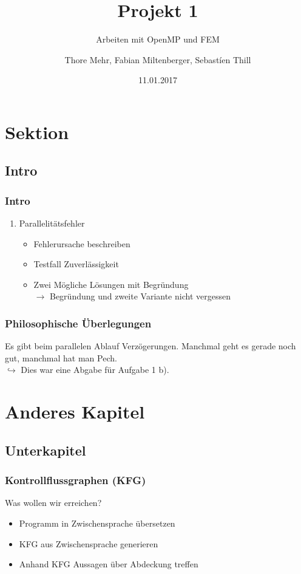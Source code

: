 \documentclass[german,notes,18pt]{beamer}
\title{Projekt 1}
\subtitle{Arbeiten mit OpenMP und FEM}
\author{Thore Mehr, Fabian Miltenberger, Sebastíen Thill}
\date{11.01.2017}
\institute{Lehrstuhl für Rechnerarchitektur und Parallelverarbeitung}
\begin{document}
	
	\frame{\titlepage}
	
	\section{Sektion}
	\subsection{Intro}
	\begin{frame}
		\frametitle{Intro}
		
		\begin{enumerate}
			\item Parallelitätsfehler
			\begin{itemize}
				\item Fehlerursache beschreiben
				\item Testfall Zuverlässigkeit
				\item Zwei Mögliche Lösungen mit Begründung \\
				$\rightarrow$ Begründung und zweite Variante nicht vergessen
			\end{itemize}
		\end{enumerate}
	\end{frame}
	
	\begin{frame}
		\frametitle{Philosophische Überlegungen}
		Es gibt beim parallelen Ablauf Verzögerungen. Manchmal geht es gerade noch gut, manchmal hat man Pech.
		\\
		\vspace{1cm}
		\onslide<2->
		$\hookrightarrow$ Dies war eine Abgabe für Aufgabe 1 b).
	\end{frame}
	
	
	
	\section{Anderes Kapitel}
	\subsection{Unterkapitel}
	\begin{frame}
		\frametitle{Kontrollflussgraphen (KFG)}
		
		Was wollen wir erreichen?
		\begin{itemize}
			\item Programm in Zwischensprache übersetzen
			\item KFG aus Zwischensprache generieren
			\item Anhand KFG Aussagen über Abdeckung treffen
		\end{itemize}
	\end{frame}
\end{document}
